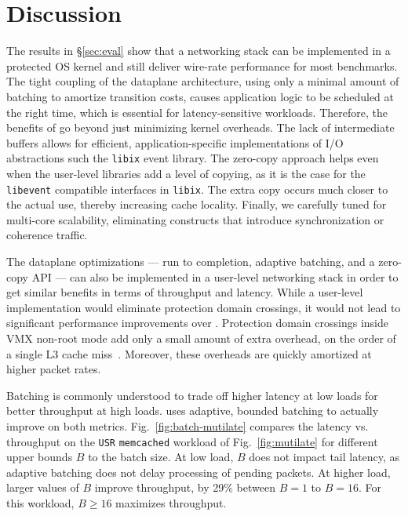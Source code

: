 
\section{Discussion}
\label{sec:disc}


 The results in \S\ref{sec:eval}
show that a networking stack can be implemented in a protected OS
kernel and still deliver wire-rate performance for most benchmarks.
The tight coupling of the dataplane architecture, using only a minimal
amount of batching to amortize transition costs, causes application
logic to be scheduled at the right time, which is essential for
latency-sensitive workloads.  Therefore, the benefits of \ix go beyond
just minimizing kernel overheads. The lack of intermediate buffers
allows for efficient, application-specific implementations of I/O
abstractions such the \texttt{libix} event library. The zero-copy
approach helps even when the user-level libraries add a level of
copying, as it is the case for the \texttt{libevent} compatible
interfaces in \texttt{libix}.  The extra copy occurs much closer to
the actual use, thereby increasing cache locality.  Finally, we
carefully tuned \ix for multi-core scalability, eliminating constructs
that introduce synchronization or coherence traffic.

The \ix dataplane optimizations --- run to completion,
  adaptive batching, and a zero-copy API --- can also be implemented in a
  user-level networking stack in order to get similar benefits in
  terms of throughput and latency. While a user-level implementation
  would eliminate protection domain crossings, it would not lead to
  significant performance improvements over \ix. Protection domain
  crossings inside VMX non-root mode add only a small amount of extra
  overhead, on the order of a single L3 cache
  miss~\cite{dune}. Moreover, these overheads are quickly amortized at
  higher packet rates.





 Batching is commonly
understood to trade off higher latency at low loads for better
throughput at high loads.  \ix uses adaptive, bounded batching to
actually improve on both metrics.  Fig.~\ref{fig:batch-mutilate}
compares the latency vs. throughput on the \texttt{USR}
\texttt{memcached} workload of Fig.~\ref{fig:mutilate} for different
upper bounds $B$ to the batch size.  At low load, $B$ does not impact
tail latency, as adaptive batching does not delay processing of
pending packets.  At higher load, larger values of $B$ improve
throughput, by 29\% between $B=1$ to $B=16$.  For this workload, $B
\ge 16$ maximizes throughput.


